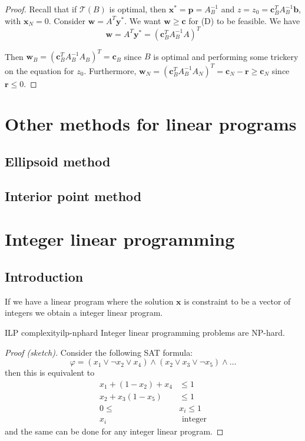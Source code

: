 \documentclass[12pt]{extarticle}
\renewcommand{\vec}[1]{\bm{#1}}
\begin{document}
\begin{proof}
	Recall that if $\mathcal T(B)$ is optimal, then $\vec x^* = \vec p = A_B^{-1}$ and
	$z = z_0 = \vec c^T_B A_B^{-1} \vec b$, with $\vec x_N = 0$.
	Consider $\vec w = A^T \vec y^*$. We want $\vec w \geq \vec c$ for (D) to be feasible.
	We have
	\begin{equation}
		\vec w = A^T \vec y^* = (\vec c^T_B A_B^{-1} A)^T
	\end{equation}

	Then $\vec w_B = (\vec c_B^T A_B^{-1}A_B)^T = \vec c_B$ since $B$ is optimal and performing some
	trickery on the equation for $z_0$.
	Furthermore, $\vec w_N  = (\vec c_B^T A_B^{-1}A_N)^T = \vec c_N - \vec r \geq \vec c_N$ since
	$\vec r \leq 0$.
\end{proof}

\section{Other methods for linear programs}
\subsection{Ellipsoid method}

\subsection{Interior point method}

\section{Integer linear programming}

\subsection{Introduction}

If we have a linear program where the solution $\vec x$ is constraint to be a vector of integers
we obtain a integer linear program.

\begin{theorem}{ILP complexity}{ilp-nphard}
	Integer linear programming problems are NP-hard.
\end{theorem}
\begin{proof}[Proof (sketch)]
	Consider the following SAT formula:
	\begin{equation}
		\varphi = (x_1 \lor \lnot x_2 \lor x_4) \land (x_2 \lor x_3 \lor \lnot x_5) \land \dots
	\end{equation}
	then
	this is equivalent to
	\begin{align}
		x_1 + (1-x_2) + x_4    & \leq 1          \\
		x_2 + x_3 (1 - x_5)    & \leq 1          \\
		0 \leq              {} & x_i \leq 1      \\
		x_i                    & \text{ integer}
	\end{align}
	and the same can be done for any integer linear program.
\end{proof}
\end{document}
